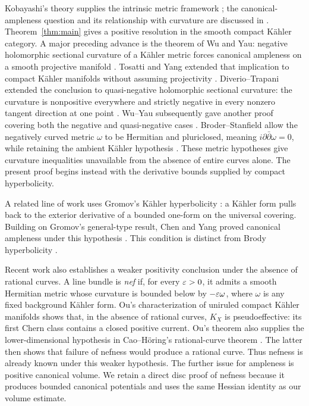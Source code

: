 Kobayashi's theory supplies the intrinsic metric framework
\cite{Kobayashi1970}; the canonical-ampleness question and its
relationship with curvature are discussed in \cite{Diverio2020}.
Theorem~\ref{thm:main} gives a positive resolution in the smooth
compact K\"ahler category. A major preceding advance is the theorem
of Wu and Yau: negative holomorphic sectional curvature of a K\"ahler metric forces
canonical ampleness on a smooth projective manifold
\cite{WuYau2016}. Tosatti and Yang extended that implication to
compact K\"ahler manifolds without assuming projectivity
\cite{TosattiYang2017}. Diverio--Trapani extended the conclusion to quasi-negative holomorphic
sectional curvature: the curvature is nonpositive everywhere and
strictly negative in every nonzero tangent direction at one point
\cite{DiverioTrapani2019}. Wu--Yau subsequently gave another proof
covering both the negative and quasi-negative cases
\cite{WuYauRemark2016}. Broder--Stanfield allow the negatively curved
metric $\omega$ to be Hermitian and pluriclosed, meaning
$i\partial\bar\partial\omega=0$, while retaining the ambient
K\"ahler hypothesis \cite[Theorem~1.1]{BroderStanfield2026}.
These metric hypotheses give curvature
inequalities unavailable from the absence of entire curves alone.
The present proof begins instead with the derivative bounds supplied
by compact hyperbolicity.

A related line of work uses Gromov's K\"ahler hyperbolicity
\cite{Gromov1991}: a K\"ahler form pulls back to the exterior
derivative of a bounded one-form on the universal covering.
Building on Gromov's general-type result, Chen and Yang proved
canonical ampleness under this hypothesis
\cite[Definitions~2.2 and~2.7, Theorem~2.11]{ChenYang2018}.
This condition is distinct from Brody hyperbolicity
\cite[Corollary~4.4]{ChenYang2018}.

Recent work also establishes a weaker positivity conclusion under the
absence of rational curves. A line bundle is \emph{nef} if, for every
$\varepsilon>0$, it admits a smooth Hermitian metric whose curvature is
bounded below by $-\varepsilon\omega$, where $\omega$ is any fixed background
K\"ahler form. Ou's characterization of uniruled compact K\"ahler manifolds
\cite[Theorem~1.1]{Ou2025} shows that, in the absence of rational
curves, $K_X$ is pseudoeffective: its first Chern class contains a
closed positive current. Ou's theorem also supplies the
lower-dimensional hypothesis in Cao--H\"oring's rational-curve theorem
\cite[Theorem~1.3]{CaoHoring2020}. The latter then shows that failure
of nefness would produce a rational curve. Thus nefness is already
known under this weaker hypothesis. The further issue for ampleness
is positive canonical volume. We retain a direct disc proof of
nefness because it produces bounded canonical potentials and uses
the same Hessian identity as our volume estimate.


